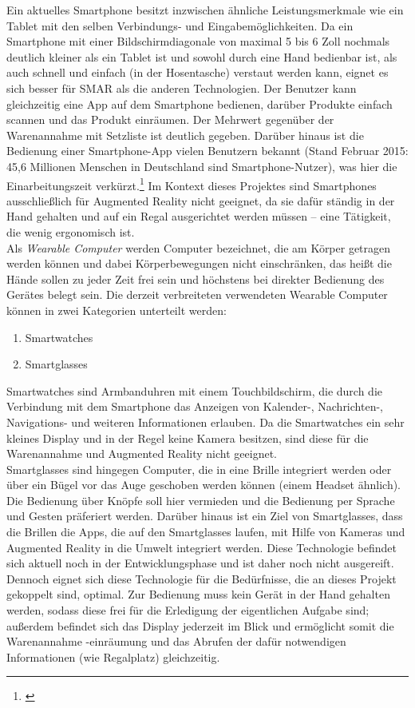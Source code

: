 Ein aktuelles Smartphone besitzt inzwischen ähnliche Leistungsmerkmale wie ein Tablet mit den selben Verbindungs- und Eingabemöglichkeiten. Da ein Smartphone mit einer Bildschirmdiagonale von maximal 5 bis 6 Zoll nochmals deutlich kleiner als ein Tablet ist und sowohl durch eine Hand bedienbar ist, als auch schnell und einfach (\zB in der Hosentasche) verstaut werden kann, eignet es sich besser für \acs{SMAR} als die anderen Technologien. Der Benutzer kann gleichzeitig eine App auf dem Smartphone bedienen, darüber Produkte einfach scannen und das Produkt einräumen. Der Mehrwert gegenüber der Warenannahme mit Setzliste ist deutlich gegeben. Darüber hinaus ist die Bedienung einer Smartphone-App vielen Benutzern bekannt (Stand Februar 2015: 45,6 Millionen Menschen in Deutschland sind Smartphone-Nutzer), was hier die Einarbeitungszeit verkürzt.\footnote{\citep{statista_smartphone}} Im Kontext dieses Projektes sind Smartphones ausschließlich für Augmented Reality nicht geeignet, da sie dafür ständig in der Hand gehalten und auf ein Regal ausgerichtet werden müssen -- eine Tätigkeit, die wenig ergonomisch ist.\\

Als \emph{Wearable Computer} werden Computer bezeichnet, die am Körper getragen werden können und dabei Körperbewegungen nicht einschränken, das heißt die Hände sollen zu jeder Zeit frei sein und höchstens bei direkter Bedienung des Gerätes belegt sein. Die derzeit verbreiteten \bzw verwendeten Wearable Computer können in zwei Kategorien unterteilt werden:
\begin{enumerate}
	\item Smartwatches
	\item Smartglasses
\end{enumerate}
Smartwatches sind Armbanduhren mit einem Touchbildschirm, die durch die Verbindung mit dem Smartphone das Anzeigen von Kalender-, Nachrichten-, Navigations- und weiteren Informationen erlauben. Da die Smartwatches ein sehr kleines Display und in der Regel keine Kamera besitzen, sind diese für die Warenannahme und Augmented Reality nicht geeignet.\\
Smartglasses sind hingegen Computer, die in eine Brille integriert werden oder über ein Bügel vor das Auge geschoben werden können (einem Headset ähnlich). Die Bedienung über Knöpfe soll hier vermieden und die Bedienung per Sprache und Gesten präferiert werden. Darüber hinaus ist ein Ziel von Smartglasses, dass die Brillen \bzw die Apps, die auf den Smartglasses laufen, mit Hilfe von Kameras und Augmented Reality in die Umwelt integriert werden. Diese Technologie befindet sich aktuell noch in der Entwicklungsphase und ist daher noch nicht ausgereift. Dennoch eignet sich diese Technologie für die Bedürfnisse, die an dieses Projekt gekoppelt sind, optimal. Zur Bedienung muss kein Gerät in der Hand gehalten werden, sodass diese frei für die Erledigung der eigentlichen Aufgabe sind; außerdem befindet sich das Display jederzeit im Blick und ermöglicht somit die Warenannahme \bzw -einräumung und das Abrufen der dafür notwendigen Informationen (wie \zB Regalplatz) gleichzeitig.\\

